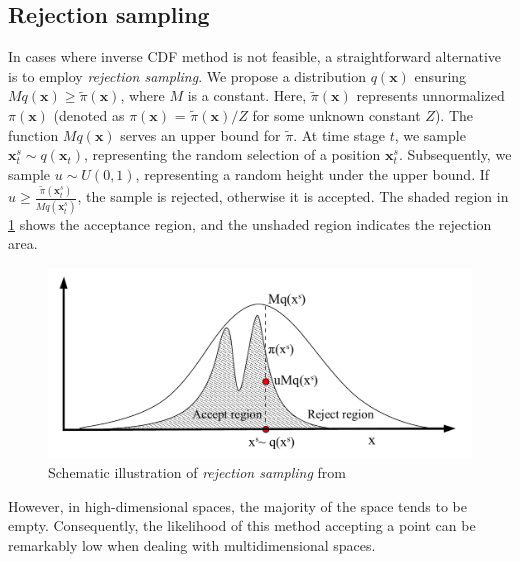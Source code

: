 \subsection{Rejection sampling}
In cases where inverse \acrshort{CDF} method is not feasible, a straightforward alternative is to employ \textit{rejection sampling}. We propose a distribution $q(\boldsymbol{x})$ ensuring $Mq(\boldsymbol{x}) \geq \tilde{\pi}(\boldsymbol{x})$, where $M$ is a constant. Here, $\tilde{\pi}(\boldsymbol{x})$ represents unnormalized $\pi(\boldsymbol{x})$ (denoted as $\pi(\boldsymbol{x})$ = $\tilde{\pi}(\boldsymbol{x})/Z$ for some unknown constant $Z$). The function $Mq(\boldsymbol{x})$ serves an upper bound for $\tilde{\pi}$. At time stage $t$, we sample $\boldsymbol{x}_{t}^{s} \sim q(\boldsymbol{x}_{t})$, representing the random selection of a position $\boldsymbol{x}_{t}^{s}$. Subsequently, we sample $u \sim U(0,1)$, representing a random height under the
upper bound. If $u \geq \frac{\tilde{\pi}(\boldsymbol{x}_{t}^{s})}{Mq(\boldsymbol{x}_{t}^{s})}$, the sample is rejected, otherwise it is accepted. The shaded region in \cref{fig: rejectsampling} shows the acceptance region, and the unshaded region indicates the rejection area.
\begin{figure}[htbp]
    \centering
    \includegraphics[width = 140mm]{Figures/figure-rejectionsampling.pdf}
\caption{Schematic illustration of \textit{rejection sampling} from \protect\cite{andrieu2003}}
\label{fig: rejectsampling}
\end{figure}
However, in high-dimensional spaces, the majority of the space tends to be empty. Consequently, the likelihood of this method accepting a point can be remarkably low when dealing with multidimensional spaces.
